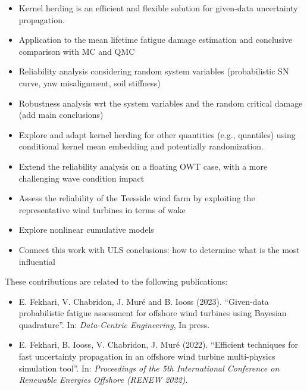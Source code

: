


\begin{itemize}
    \item Kernel herding is an efficient and flexible solution for given-data uncertainty propagation. 
    \item Application to the mean lifetime fatigue damage estimation and conclusive comparison with MC and QMC
    \item Reliability analysis considering random system variables (probabilistic SN curve, yaw misalignment, soil stiffness)
    \item Robustness analysis wrt the system variables and the random critical damage (add main conclusions)
\end{itemize}

\begin{itemize}
    \item Explore and adapt kernel herding for other quantities (e.g., quantiles) using conditional kernel mean embedding and potentially randomization. 
    \item Extend the reliability analysis on a floating OWT case, with a more challenging wave condition impact
    \item Assess the reliability of the Teesside wind farm by exploiting the representative wind turbines in terms of wake
    \item Explore nonlinear cumulative models 
    \item Connect this work with ULS conclusions: how to determine what is the most influential
\end{itemize}

These contributions are related to the following publications:
\begin{itemize}
    \footnotesize
    \item[\ding{125}] E. Fekhari, V. Chabridon, J. Muré and B. Iooss (2023). ``Given-data probabilistic fatigue assessment for offshore wind turbines using Bayesian quadrature''. In: \textit{Data-Centric Engineering}, In press.
    \item[\ding{125}] E. Fekhari, B. Iooss, V. Chabridon, J. Muré (2022). ``Efficient techniques for fast uncertainty propagation in an offshore wind turbine multi-physics simulation tool''. In: \textit{Proceedings of the 5th International Conference on Renewable Energies Offshore (RENEW 2022)}.
\end{itemize}

